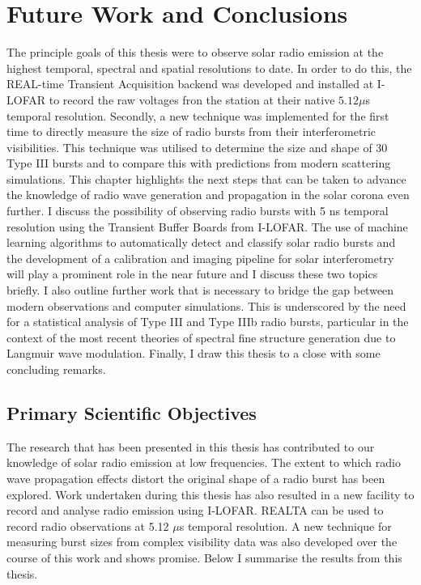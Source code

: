 \doublespacing
\chapter{Future Work and Conclusions}
\label{chap:future}
The principle goals of this thesis were to observe solar radio emission at the highest temporal, spectral and spatial resolutions to date. In order to do this, the REAL-time Transient Acquisition backend was developed and installed at I-LOFAR to record the raw voltages fron the station at their native $5.12 \mu$s temporal resolution.
Secondly, a new technique was implemented for the first time to directly measure the size of radio bursts from their interferometric visibilities. This technique was utilised to determine the size and shape of 30 Type III bursts and to compare this with predictions from modern scattering simulations.
This chapter highlights the next steps that can be taken to advance the knowledge of radio wave generation and propagation in the solar corona even further. I discuss the possibility of observing radio bursts with 5 ns temporal resolution using the Transient Buffer Boards from I-LOFAR. The use of machine learning algorithms to automatically detect and classify solar radio bursts and the development of a calibration and imaging pipeline for solar interferometry will play a prominent role in the near future and I discuss these two topics briefly. I also outline further work that is necessary to bridge the gap between modern observations and computer simulations. This is underscored by the need for a statistical analysis of Type III and Type IIIb radio bursts, particular in the context of the most recent theories of spectral fine structure generation due to Langmuir wave modulation. Finally, I draw this thesis to a close with some concluding remarks.

\section{Primary Scientific Objectives}
The research that has been presented in this thesis has contributed to our knowledge of solar radio emission at low frequencies. The extent to which radio wave propagation effects distort the original shape of a radio burst has been explored. Work undertaken during this thesis has also resulted in a new facility to record and analyse radio emission using I-LOFAR. REALTA can be used to record radio observations at 5.12 $\mu$s temporal resolution. A new technique for measuring burst sizes from complex visibility data was also developed over the course of this work and shows promise. Below I summarise the results from this thesis. 

